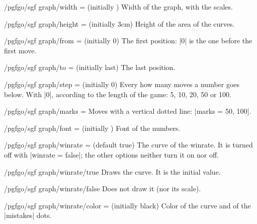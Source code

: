 \begin{key}{/pgfgo/sgf graph/width =  (initially \string\linewidth)}
	Width of the graph, with the scales.
\end{key}

\begin{key}{/pgfgo/sgf graph/height =  (initially 3cm)}
	Height of the area of the curves.
\end{key}

\begin{key}{/pgfgo/sgf graph/from =  (initially 0)}
	The first position: |0| is the one before the first move.
\end{key}

\begin{key}{/pgfgo/sgf graph/to =  (initially last)}
	The last position.
\end{key}

\begin{key}{/pgfgo/sgf graph/step =  (initially 0)}
	Every how many moves a number goes below. With |0|, according to the length of the game: 5, 10, 20, 50 or 100.
\end{key}

\begin{key}{/pgfgo/sgf graph/marks = }
	Moves with a vertical dotted line: |marks = {50, 100}|.
\end{key}

\begin{key}{/pgfgo/sgf graph/font =  (initially \string\footnotesize)}
	Font of the numbers.
\end{key}

\begin{key}{/pgfgo/sgf graph/winrate =  (default true)}
	The curve of the winrate. It is turned off with |winrate = false|; the other options neither turn it on nor off.
\end{key}

\begin{stylekey}{/pgfgo/sgf graph/winrate/true}
	Draws the curve. It is the initial value.
\end{stylekey}

\begin{stylekey}{/pgfgo/sgf graph/winrate/false}
	Does not draw it (nor its scale).
\end{stylekey}

\begin{key}{/pgfgo/sgf graph/winrate/color =  (initially black)}
	Color of the curve and of the |mistakes| dots.
\end{key}

